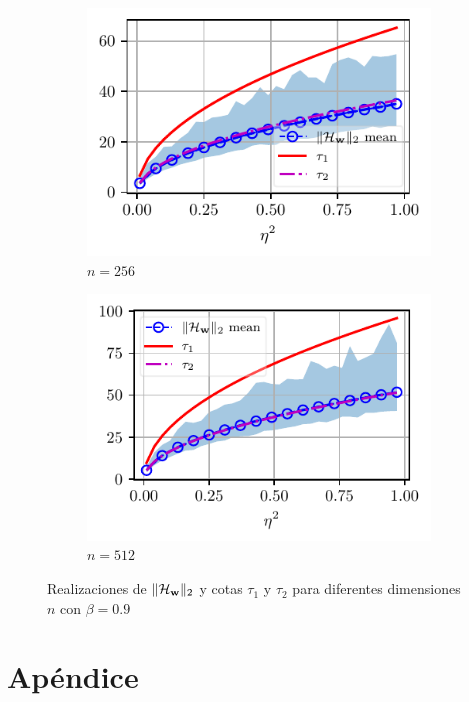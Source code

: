 \begin{figure}[t]
\begin{subfigure}{0.4\linewidth}
			\includegraphics[width = \linewidth]{Figuras/taus_N_256_beta_0.9.pdf}
			\caption{$n = 256$}
		\end{subfigure}
		\begin{subfigure}{0.4\linewidth}
			\centering
			\includegraphics[width = \linewidth]{Figuras/taus_N_512_beta_0.9.pdf}
			\caption{$n = 512$}
		\end{subfigure}
		\caption{Realizaciones de $\|\mathcal{H}_{\mathbf{w}}\|_2$ y cotas $\tau_1$ y $\tau_2$ para diferentes dimensiones $n$ con $\beta = 0.9$}
		\label{fig:taus11}
	\end{figure}

\newpage

\section{Apéndice}
